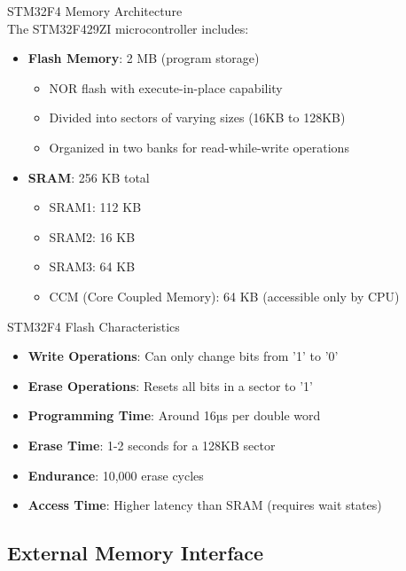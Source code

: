 \begin{concept}{STM32F4 Memory Architecture}\\
The STM32F429ZI microcontroller includes:
\begin{itemize}
    \item \textbf{Flash Memory}: 2 MB (program storage)
    \begin{itemize}
        \item NOR flash with execute-in-place capability
        \item Divided into sectors of varying sizes (16KB to 128KB)
        \item Organized in two banks for read-while-write operations
    \end{itemize}
    \item \textbf{SRAM}: 256 KB total
    \begin{itemize}
        \item SRAM1: 112 KB
        \item SRAM2: 16 KB
        \item SRAM3: 64 KB
        \item CCM (Core Coupled Memory): 64 KB (accessible only by CPU)
    \end{itemize}
\end{itemize}
\end{concept}

\begin{definition}{STM32F4 Flash Characteristics}
\begin{itemize}
    \item \textbf{Write Operations}: Can only change bits from '1' to '0'
    \item \textbf{Erase Operations}: Resets all bits in a sector to '1'
    \item \textbf{Programming Time}: Around 16µs per double word
    \item \textbf{Erase Time}: 1-2 seconds for a 128KB sector
    \item \textbf{Endurance}: 10,000 erase cycles
    \item \textbf{Access Time}: Higher latency than SRAM (requires wait states)
\end{itemize}
\end{definition}

\subsection{External Memory Interface}

